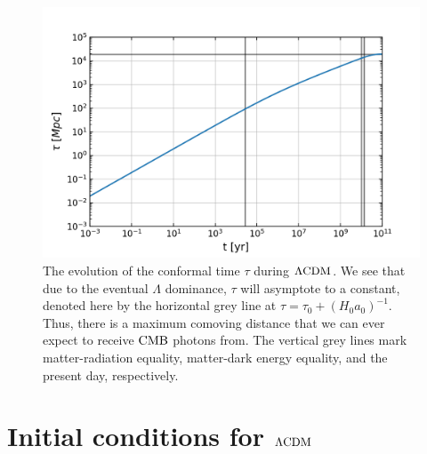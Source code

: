 \begin{figure}[h!]
\centering     %
    \includegraphics[width=.75\columnwidth]{plots/lcdm_tau.png}
\caption{
    The evolution of the conformal time $\tau$ during $\Lambda\text{CDM}$.
    We see that
    due to the eventual $\Lambda$ dominance,
    $\tau$ will asymptote to a constant,
    denoted here by the horizontal grey line at $\tau=\tau_0+(H_0a_0)^{-1}$.
    Thus, there is a maximum comoving distance that we can ever
    expect to receive $\text{CMB}$ photons from.
    The vertical grey lines mark matter-radiation equality, matter-dark energy equality,
    and the present day, respectively.
}\label{fig:lcdm_tau}
\end{figure}




\section{Initial conditions for $\Lambda\text{CDM}$}
